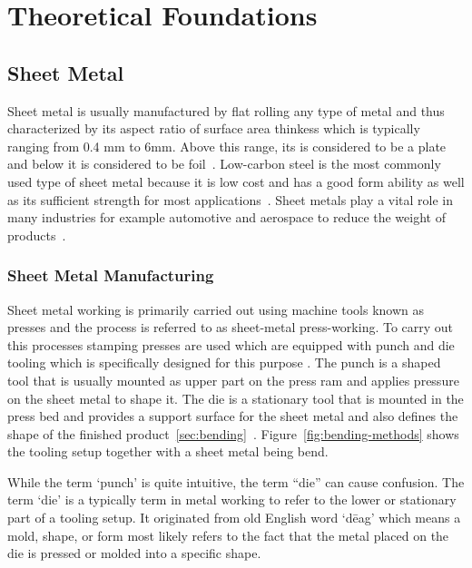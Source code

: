 \chapter{Theoretical Foundations}\label{ch:theoretical-foundations}


\section{Sheet Metal}\label{sec:sheet-metal}
Sheet metal is usually manufactured by flat rolling any type of metal and thus characterized by
its aspect ratio of surface area thinkess which is typically ranging from 0.4 mm to 6mm.
Above this range, its is considered to be a plate and below it is considered to be
foil~\cite[p. 405]{groover_fundamentalsmodernmanufacturing_2020}.
Low-carbon steel is the most commonly used type of sheet metal because it is low cost and has a good form ability as
well as its sufficient strength for most applications~\cite[p. 405]{groover_fundamentalsmodernmanufacturing_2020}.
Sheet metals play a vital role in many industries for example automotive and aerospace to reduce the weight of
products~\cite[pp. 1]{zheng_reviewformingtechniques_2018}.

\subsection{Sheet Metal Manufacturing}\label{subsec:sheet-metal-manufacturing}
Sheet metal working is primarily carried out using machine tools known as presses and the process
is referred to as sheet-metal press-working.
To carry out this processes stamping presses are used which are equipped with punch and die
tooling which is specifically designed for this purpose
\cite[p. 405]{groover_fundamentalsmodernmanufacturing_2020}.
The punch is a shaped tool that is usually mounted as upper part on the press ram and applies
pressure on the sheet metal to shape it.
The die is a stationary tool that is mounted in the press bed and provides a support surface for
the sheet metal and also defines the shape of the finished
product~\ref{sec:bending}~\cite[p. 412]{groover_fundamentalsmodernmanufacturing_2020}.
Figure~\ref{fig:bending-methods} shows the tooling setup together with a sheet metal being bend.

While the term `punch' is quite intuitive, the term ``die'' can cause confusion.
The term `die' is a typically term in metal working to refer to the lower or stationary part of a tooling setup.
It originated from old English word `dēag' which means a mold, shape, or form most likely refers to the fact that
the metal placed on the die is pressed or molded into a specific shape.

